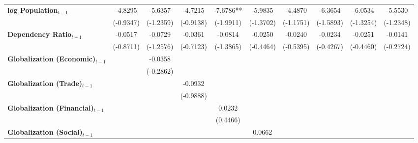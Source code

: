 \begin{center}
\begin{tabular}{lccccccccc}
\textbf{log Population$_{t-1}$}      &    -4.8295     &     -5.6357      &     -4.7215      &    -7.6786**     &     -5.9835      &     -4.4870      &     -6.3654      &     -6.0534      &     -5.5530       \\
\textbf{ }                         &   (-0.9347)    &    (-1.2359)     &    (-0.9138)     &    (-1.9911)     &    (-1.3702)     &    (-1.1751)     &    (-1.5893)     &    (-1.3254)     &    (-1.2348)      \\
\textbf{Dependency Ratio$_{t-1}$}   &    -0.0517     &     -0.0729      &     -0.0361      &     -0.0814      &     -0.0250      &     -0.0240      &     -0.0234      &     -0.0251      &     -0.0141       \\
\textbf{ }                         &   (-0.8711)    &    (-1.2576)     &    (-0.7123)     &    (-1.3865)     &    (-0.4464)     &    (-0.5395)     &    (-0.4267)     &    (-0.4460)     &    (-0.2724)      \\
\textbf{Globalization (Economic)$_{t-1}$}             &                &     -0.0358      &                  &                  &                  &                  &                  &                  &                   \\
\textbf{ }                         &                &    (-0.2862)     &                  &                  &                  &                  &                  &                  &                   \\
\textbf{Globalization (Trade)$_{t-1}$}             &                &                  &     -0.0932      &                  &                  &                  &                  &                  &                   \\
\textbf{ }                         &                &                  &    (-0.9888)     &                  &                  &                  &                  &                  &                   \\
\textbf{Globalization (Financial)$_{t-1}$}             &                &                  &                  &      0.0232      &                  &                  &                  &                  &                   \\
\textbf{ }                         &                &                  &                  &     (0.4466)     &                  &                  &                  &                  &                   \\
\textbf{Globalization (Social)$_{t-1}$}             &                &                  &                  &                  &      0.0662      &                  &                  &                  &                   \\

\end{tabular}
\end{center}
